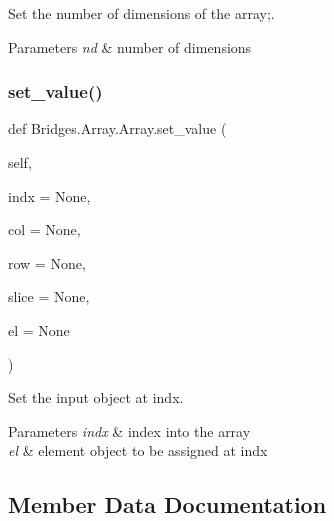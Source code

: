 Set the number of dimensions of the array;. 


\begin{DoxyParams}{Parameters}
{\em nd} & number of dimensions \\
\hline
\end{DoxyParams}
\mbox{\label{class_bridges_1_1_array_1_1_array_a900af8a17ee9cac42e2d23b00562a783}} 
\subsubsection{\texorpdfstring{set\+\_\+value()}{set\_value()}}
{\footnotesize\ttfamily def Bridges.\+Array.\+Array.\+set\+\_\+value (\begin{DoxyParamCaption}\item[{}]{self,  }\item[{}]{indx = {\ttfamily None},  }\item[{}]{col = {\ttfamily None},  }\item[{}]{row = {\ttfamily None},  }\item[{}]{slice = {\ttfamily None},  }\item[{}]{el = {\ttfamily None} }\end{DoxyParamCaption})}



Set the input object at \textquotesingle{}indx\textquotesingle{}. 


\begin{DoxyParams}{Parameters}
{\em indx} & index into the array \\
\hline
{\em el} & element object to be assigned at \textquotesingle{}indx\textquotesingle{} \\
\hline
\end{DoxyParams}


\subsection{Member Data Documentation}
\mbox{\label{class_bridges_1_1_array_1_1_array_adad31f6bdd4c1c1fb95fab792d37455d}} 
